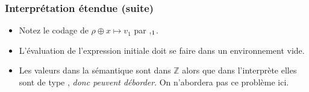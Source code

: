 %
\begin{frame}
\frametitle{Interprétation étendue (suite)}

\begin{itemize}

  \item Notez le codage de $\rho \oplus x \mapsto v_1$ par
  {\small {}  \lpar{},\(\sb{1}\)\rpar}.

  \item L'évaluation de l'expression initiale doit se faire
  dans un environnement vide.

  \item Les valeurs dans la sémantique sont dans $\mathbb{Z}$ alors
  que dans l'interprète elles sont de type , \emph{donc
  peuvent déborder}. On n'abordera pas ce problème ici.

\end{itemize}


\end{frame}

